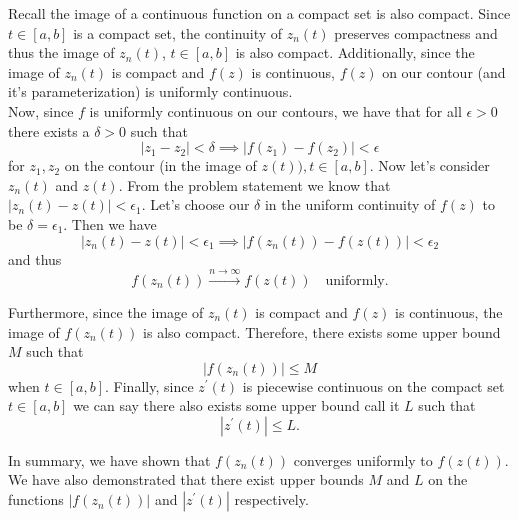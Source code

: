 \documentclass[10pt]{amsart}
\theoremstyle{nonumberplain}
\begin{document}
\begin{enumerate}[label={\bf {\arabic*}:}]
\noindent
Recall the image of a continuous function on a compact set is also compact.
Since $t \in [a, b]$ is a compact set, the continuity of $z_n(t)$ preserves compactness and thus the image of $z_n(t)$, $t \in [a, b]$ is also compact.
Additionally, since the image of $z_n(t)$ is compact and $f(z)$ is continuous, $f(z)$ on our contour (and it's parameterization) is uniformly continuous. \\

\noindent
Now, since $f$ is uniformly continuous on our contours, we have that for all $\epsilon > 0$ there exists a $\delta > 0$ such that
$$
\left| z_1 - z_2 \right| < \delta \implies \left| f(z_1) - f(z_2) \right| < \epsilon
$$
for $z_1, z_2$ on the contour (in the image of $z(t)), t \in [a, b]$.
Now let's consider $z_n(t)$ and $z(t)$.
From the problem statement we know that $| z_n(t) - z(t) | < \epsilon_1$. Let's choose our $\delta$ in the uniform continuity of $f(z)$ to be $\delta = \epsilon_1$. Then we have
$$| z_n(t) - z(t) | < \epsilon_1 \implies | f(z_n(t)) - f(z(t)) | < \epsilon_2$$
and thus $$f(z_n(t)) \overset{n \to \infty}{\longrightarrow} f(z(t)) \quad \text{uniformly}.$$

\noindent
Furthermore, since the image of $z_n(t)$ is compact and $f(z)$ is continuous, the image of $f(z_n(t))$ is also compact.
Therefore, there exists some upper bound $M$ such that
$$|f(z_n(t))| \leq M$$
when $t \in [a, b]$. 
Finally, since $z^\prime(t)$ is piecewise continuous on the compact set $t \in [a, b]$ we can say there also exists some upper bound call it $L$ such that 
$$|z^\prime(t)| \leq L.$$

\noindent
In summary, we have shown that $f(z_n(t))$ converges uniformly to $f(z(t))$.
We have also demonstrated that there exist upper bounds $M$ and $L$ on the functions $|f(z_n(t))|$ and $|z^\prime(t)|$ respectively. \\


\end{enumerate}
\end{document}
